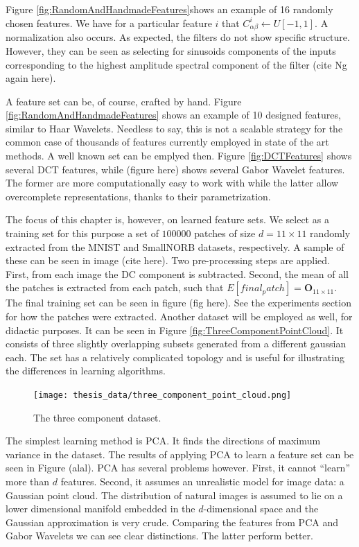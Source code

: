 \documentclass[12pt,a4paper,oneside,english]{UPBThesis}
\newcommand{\hctimes}[2]{{#1}\!\times\!{#2}}
\begin{document}
Figure \ref{fig:RandomAndHandmadeFeatures}shows an example of 16 randomly chosen features. We have for a particular feature $i$ that $C^i_{\alpha\beta} \leftarrow U[-1,1]$. A normalization also occurs. As expected, the filters do not show specific structure. However, they can be seen as selecting for sinusoids components of the inputs corresponding to the highest amplitude spectral component of the filter (cite Ng again here).

A feature set can be, of course, crafted by hand. Figure \ref{fig:RandomAndHandmadeFeatures} shows an example of 10 designed features, similar to Haar Wavelets. Needless to say, this is not a scalable strategy for the common case of thousands of features currently employed in state of the art methods. A well known set can be emplyed then. Figure \ref{fig:DCTFeatures} shows several DCT features, while (figure here) shows several Gabor Wavelet features. The former are more computationally easy to work with while the latter allow overcomplete representations, thanks to their parametrization.

The focus of this chapter is, however, on learned feature sets. We select as a training set for this purpose a set of $100000$ patches of size $d = \hctimes{11}{11}$ randomly extracted from the MNIST and SmallNORB datasets, respectively. A sample of these can be seen in image (cite here). Two pre-processing steps are applied. First, from each image the DC component is subtracted. Second, the mean of all the patches is extracted from each patch, such that $E[final_patch] = \textbf{O}_{\hctimes{11}{11}}$. The final training set can be seen in figure (fig here). See the experiments section for how the patches were extracted. Another dataset will be employed as well, for didactic purposes. It can be seen in Figure \ref{fig:ThreeComponentPointCloud}. It consists of three slightly overlapping subsets generated from a different gaussian each. The set has a relatively complicated topology and is useful for illustrating the differences in learning algorithms.

\begin{figure}
\centering
\texttt{[image: thesis\_data/three\_component\_point\_cloud.png]}
\caption{The three component dataset.}
\label{fig:ThreeComponentPointColud}
\end{figure}

The simplest learning method is PCA. It finds the directions of maximum variance in the dataset. The results of applying PCA to learn a feature set can be seen in Figure (alal). PCA has several problems however. First, it cannot ``learn'' more than $d$ features. Second, it assumes an unrealistic model for image data: a Gaussian point cloud. The distribution of natural images is assumed to lie on a lower dimensional manifold embedded in the $d$-dimensional space and the Gaussian approximation is very crude. Comparing the features from PCA and Gabor Wavelets we can see clear distinctions. The latter perform better.
\end{document}
